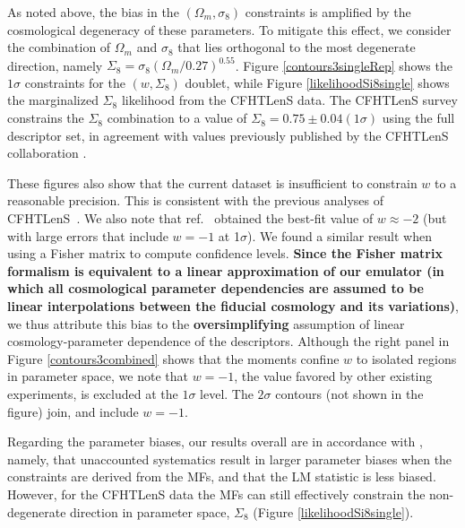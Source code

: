 \documentclass[reprint,aps,prd,superscriptaddress,showkeys,showpacs]{revtex4-1}
\begin{document}
As noted above, the bias in the $(\Omega_m,\sigma_8)$ constraints is
amplified by the cosmological degeneracy of these parameters. To
mitigate this effect, we consider the combination of $\Omega_m$ and
$\sigma_8$ that lies orthogonal to the most degenerate direction,
namely $\Sigma_8=\sigma_8(\Omega_m/0.27)^{0.55}$. Figure
\ref{contours3singleRep} shows the $1\sigma$ constraints for the
$(w,\Sigma_8)$ doublet, while Figure \ref{likelihoodSi8single} shows
the marginalized $\Sigma_8$ likelihood from the CFHTLenS data. The
CFHTLenS survey constrains the $\Sigma_8$ combination to a value of
$\Sigma_8=0.75\pm0.04(1\sigma)$ using the full descriptor set, in
agreement with values previously published by the CFHTLenS
collaboration \citep{CFHTKilbinger}. 

These figures also show that the current dataset is insufficient to
constrain $w$ to a reasonable precision.
This is consistent with the previous analyses of
CFHTLenS~\citep{CFHTKilbinger,CFHTFu,Companion,CFHTMasato}.  We also
note that ref.~\citep{CFHTMasato} obtained the best-fit value of
$w\approx -2$ (but with large errors that include $w=-1$ at
1$\sigma$).  We found a similar result when using a Fisher matrix to
compute confidence levels. \textbf{Since the Fisher matrix formalism is equivalent to a linear approximation of our emulator (in which all cosmological parameter dependencies are assumed to be linear interpolations between the fiducial cosmology and its variations)}, we thus attribute this bias to the \textbf{oversimplifying} assumption of linear cosmology-parameter dependence of the descriptors.  
Although the right panel in Figure
\ref{contours3combined} shows that the moments confine $w$ to isolated
regions in parameter space, we note that $w=-1$, the value favored by other existing experiments, is excluded at the $1\sigma$
level. The $2\sigma$ contours (not shown in the figure) join, and
include $w=-1$.


Regarding the parameter biases, our results overall are in accordance
with \citep{PetriSpurious}, namely, that unaccounted systematics
result in larger parameter biases when the constraints are derived
from the MFs, and that the LM statistic is less biased. However, for
the CFHTLenS data the MFs can still effectively constrain the
non-degenerate direction in parameter space, $\Sigma_8$ (Figure
\ref{likelihoodSi8single}).
\end{document}
